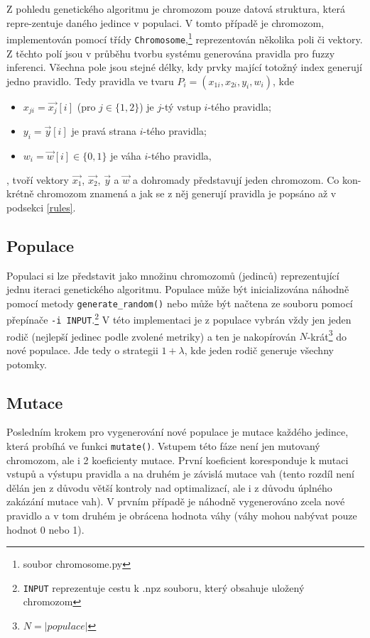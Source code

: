\documentclass{article}
\begin{document}
Z pohledu genetického algoritmu je chromozom pouze datová struktura, která repre-zentuje daného jedince v populaci. V tomto případě je chromozom, implementován pomocí třídy \texttt{Chromosome},\footnote{soubor chromosome.py} reprezentován několika poli či vektory. Z těchto polí jsou v průběhu tvorbu systému generována pravidla pro fuzzy inferenci. Všechna pole jsou stejné délky, kdy prvky mající totožný index generují jedno pravidlo. Tedy pravidla ve tvaru $P_i = (x_{1i}, x_{2i}, y_i, w_i)$, kde

\begin{itemize}
    \item $x_{ji} = \overrightarrow{x_j}\left[i\right]$ (pro $j \in \{1, 2\}$) je $j$-tý vstup $i$-tého pravidla;
    \item $y_i = \overrightarrow{y}\left[i\right]$ je pravá strana $i$-tého pravidla;
    \item $w_i = \overrightarrow{w}\left[i\right] \in \{0, 1\}$ je váha $i$-tého pravidla,
\end{itemize}
, tvoří vektory $\overrightarrow{x_1}$, $\overrightarrow{x_2}$, $\overrightarrow{y}$ a $\overrightarrow{w}$ a dohromady představují jeden chromozom. Co kon-krétně chromozom znamená a jak se z něj generují pravidla je popsáno až v podsekci \ref{rules}.

\subsection{Populace}

Populaci si lze představit jako množinu chromozomů (jedinců) reprezentující jednu iteraci genetického algoritmu. Populace může být inicializována náhodně pomocí metody \texttt{generate\_random()} nebo může být načtena ze souboru pomocí přepínače \texttt{-i INPUT}.\footnote{\texttt{INPUT} reprezentuje cestu k .npz souboru, který obsahuje uložený chromozom} V této implementaci je z populace vybrán vždy jen jeden rodič (nejlepší jedinec podle zvolené metriky) a ten je nakopírován $N$-krát\footnote{$N = |populace|$} do nové populace. Jde tedy o strategii $1 + \lambda$, kde jeden rodič generuje všechny potomky.

\subsection{Mutace}

Posledním krokem pro vygenerování nové populace je mutace každého jedince, která probíhá ve funkci \texttt{mutate()}. Vstupem této fáze není jen mutovaný chromozom, ale i 2 koeficienty mutace. První koeficient koresponduje k mutaci vstupů a výstupu pravidla a na druhém je závislá mutace vah (tento rozdíl není dělán jen z důvodu větší kontroly nad optimalizací, ale i z důvodu úplného zakázání mutace vah). V prvním případě je náhodně vygenerováno zcela nové pravidlo a v tom druhém je obrácena hodnota váhy (váhy mohou nabývat pouze hodnot 0 nebo 1).
\end{document}
